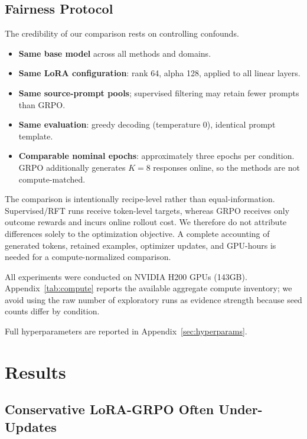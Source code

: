 \documentclass[11pt]{article}
\begin{document}
\subsection{Fairness Protocol}

The credibility of our comparison rests on controlling confounds.
\begin{itemize}
\item \textbf{Same base model} across all methods and domains.
\item \textbf{Same LoRA configuration}: rank 64, alpha 128, applied to all linear layers.
\item \textbf{Same source-prompt pools}; supervised filtering may retain fewer prompts than GRPO.
\item \textbf{Same evaluation}: greedy decoding (temperature 0), identical prompt template.
\item \textbf{Comparable nominal epochs}: approximately three epochs per condition. GRPO additionally generates $K=8$ responses online, so the methods are not compute-matched.
\end{itemize}

The comparison is intentionally recipe-level rather than equal-information. Supervised/RFT runs receive token-level targets, whereas GRPO receives only outcome rewards and incurs online rollout cost. We therefore do not attribute differences solely to the optimization objective. A complete accounting of generated tokens, retained examples, optimizer updates, and GPU-hours is needed for a compute-normalized comparison.

All experiments were conducted on NVIDIA H200 GPUs (143GB). Appendix~\ref{tab:compute} reports the available aggregate compute inventory; we avoid using the raw number of exploratory runs as evidence strength because seed counts differ by condition.

Full hyperparameters are reported in Appendix~\ref{sec:hyperparams}.

\section{Results}
\label{sec:results}

\subsection{Conservative LoRA-GRPO Often Under-Updates}
\end{document}
